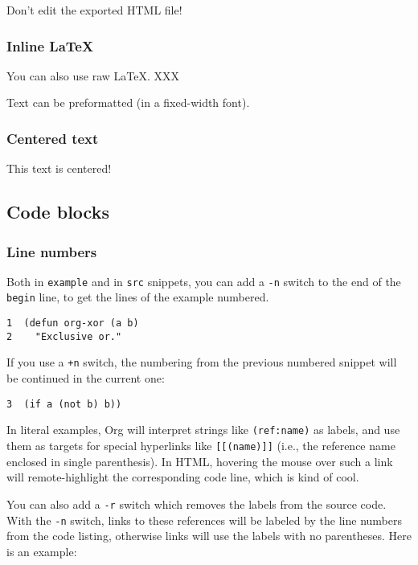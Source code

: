 \documentclass[11pt]{article}
\begin{document}
Don't edit the exported HTML file!

\subsubsection*{Inline \LaTeX{}}
\label{sec:org140a4cc}

You can also use raw \LaTeX{}. XXX

Text can be preformatted (in a fixed-width font).

\subsubsection*{Centered text}
\label{sec:orgd21eef9}

\begin{center}
This text is centered!
\end{center}

\subsection*{Code blocks}
\label{sec:org545dbcb}

\subsubsection*{Line numbers}
\label{sec:org901f276}

Both in \texttt{example} and in \texttt{src} snippets, you can add a \texttt{-n} switch to the end of the
\texttt{begin} line, to get the lines of the example numbered.

\begin{verbatim}
1  (defun org-xor (a b)
2    "Exclusive or."
\end{verbatim}

If you use a \texttt{+n} switch, the numbering from the previous numbered snippet will
be continued in the current one:

\begin{verbatim}
3  (if a (not b) b))
\end{verbatim}

In literal examples, Org will interpret strings like \texttt{(ref:name)} as labels, and
use them as targets for special hyperlinks like \texttt{[[(name)]]} (i.e., the reference
name enclosed in single parenthesis).  In HTML, hovering the mouse over such
a link will remote-highlight the corresponding code line, which is kind of
cool.

You can also add a \texttt{-r} switch which removes the labels from the source code.
With the \texttt{-n} switch, links to these references will be labeled by the line
numbers from the code listing, otherwise links will use the labels with no
parentheses.  Here is an example:
\end{document}
